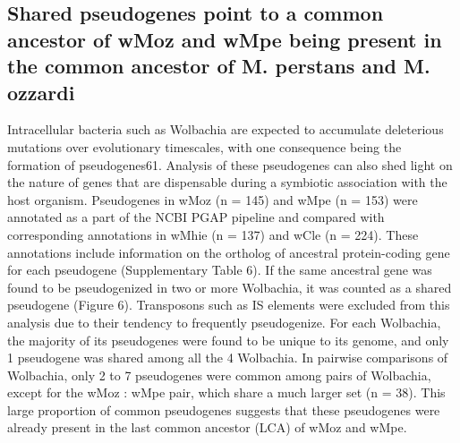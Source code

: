\documentclass[10pt, a4paper, twocolumn]{article} %
\begin{document}
\subsection{Shared pseudogenes point to a common ancestor of wMoz and wMpe being present in the common ancestor of M. perstans and M. ozzardi}
Intracellular bacteria such as Wolbachia are expected to accumulate deleterious mutations over evolutionary timescales, with one consequence being the formation of pseudogenes61. Analysis of these pseudogenes can also shed light on the nature of genes that are dispensable during a symbiotic association with the host organism. Pseudogenes in wMoz (n = 145) and wMpe (n = 153) were annotated as a part of the NCBI PGAP pipeline and compared with corresponding annotations in wMhie (n = 137) and wCle (n = 224). These annotations include information on the ortholog of ancestral protein-coding gene for each pseudogene (Supplementary Table 6). If the same ancestral gene was found to be pseudogenized in two or more Wolbachia, it was counted as a shared pseudogene (Figure 6). Transposons such as IS elements were excluded from this analysis due to their tendency to frequently pseudogenize. 
For each Wolbachia, the majority of its pseudogenes were found to be unique to its genome, and only 1 pseudogene was shared among all the 4 Wolbachia. In pairwise comparisons of Wolbachia, only 2 to 7 pseudogenes were common among pairs of Wolbachia, except for the wMoz : wMpe pair, which share a much larger set (n = 38). This large proportion of common pseudogenes suggests that these pseudogenes were already present in the last common ancestor (LCA) of wMoz and wMpe.
\end{document}
